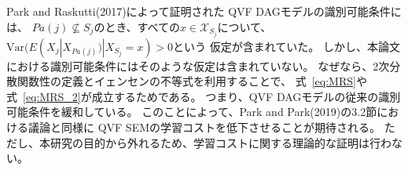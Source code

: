 Park and Raskutti(2017)\cite{Park2017-hw}によって証明された
QVF DAGモデルの識別可能条件には、
$Pa(j) \nsubseteq S_j$のとき、すべての$x \in \mathcal X_{S_j}$について、
$\mathrm{Var}(E(X_j | X_{Pa(j)}) | X_{S_j} = x) > 0$という
仮定が含まれていた。
しかし、本論文における識別可能条件にはそのような仮定は含まれていない。
なぜなら、2次分散関数性の定義とイェンセンの不等式を利用することで、
式~\eqref{eq:MRS}や式~\eqref{eq:MRS_2}が成立するためである。
つまり、QVF DAGモデルの従来の識別可能条件\cite{Park2017-hw}を緩和している。
このことによって、Park and Park(2019)\cite{Park2019-qy}の3.2節における議論と同様に
QVF SEMの学習コストを低下させることが期待される。
ただし、本研究の目的から外れるため、学習コストに関する理論的な証明は行わない。
